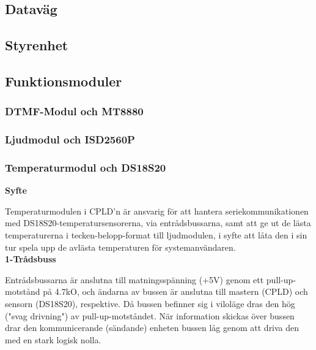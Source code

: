 \documentclass[a4paper,11pt]{article}
\begin{document}
	\subsection{Dataväg}

		

	\subsection{Styrenhet}

	\subsection{Funktionsmoduler}

		\subsubsection{DTMF-Modul och MT8880}
	
		\subsubsection{Ljudmodul och ISD2560P}

		\subsubsection{Temperaturmodul och DS18S20}

{\bf Syfte}

Temperaturmodulen i CPLD'n är ansvarig för att hantera seriekommunikationen med 
DS18S20-temperatursensorerna, via entrådsbussarna, samt att ge ut de lästa temperaturerna
i tecken-belopp-format till ljudmodulen, i syfte att låta den i sin tur spela upp de avlästa
temperaturen för systemanvändaren.\\

{\noindent \bf 1-Trådsbuss}

Entrådsbussarna är anslutna till matningsspänning (+5V) genom ett pull-up-motstånd på 4.7kO, och
ändarna av bussen är anslutna till mastern (CPLD) och sensorn (DS18S20), respektive. Då bussen
befinner sig i viloläge dras den hög ("svag drivning") av pull-up-motståndet. När information
skickas över bussen drar den kommunicerande (sändande) enheten bussen låg genom att driva den
med en stark logisk nolla.\\
\end{document}
